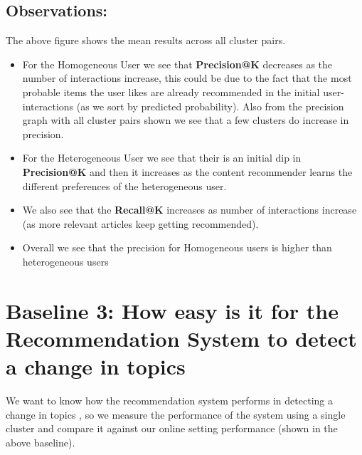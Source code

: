 \documentclass[a4paper,fontsize=9.0pt]{scrartcl}
\begin{document}
\subsection{Observations:}
\begin{flushleft}
The above figure shows the mean results across all cluster pairs.
\begin{itemize}
    \item For the Homogeneous User we see that \textbf{Precision@K} decreases as the number of interactions increase, this could be due to the fact that the most probable items the user likes are already recommended in the initial user-interactions (as we sort by predicted probability). Also from the precision graph with all cluster pairs shown we see that a few clusters do increase in precision.
    \item For the Heterogeneous User we see that their is an initial dip in \textbf{Precision@K} and then it increases as the content recommender learns the different preferences of the heterogeneous user.
    \item We also see that the \textbf{Recall@K} increases as number of interactions increase (as more relevant articles keep getting recommended).
    \item Overall we see that the precision for Homogeneous users is higher than heterogeneous users
\end{itemize}
\end{flushleft}


\vspace{-1ex}
\newpage
\section{Baseline 3: How easy is it for the Recommendation System to detect a change in topics}
\begin{flushleft}
We want to know how the recommendation system performs in detecting a change in topics , so we measure the performance of the system using a single cluster and compare it against our online setting performance (shown in the above baseline). 
\end{flushleft}
\end{document}
